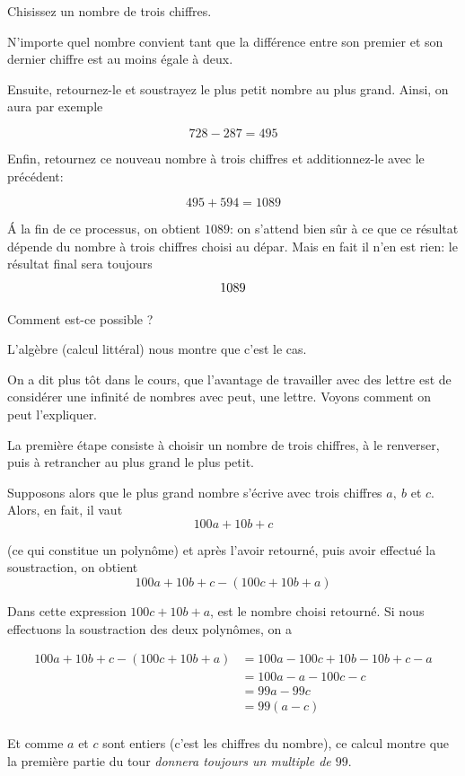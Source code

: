 \documentclass[
  12pt,
]{book}
\begin{document}
Chisissez un nombre de trois chiffres.

N'importe quel nombre convient tant que la différence entre son premier et son dernier chiffre est au moins égale à deux.

Ensuite, retournez-le et soustrayez le plus petit nombre au plus grand. Ainsi, on aura par exemple

\[728-287=495\]

Enfin, retournez ce nouveau nombre à trois chiffres et additionnez-le avec le précédent:

\[495+594=1089\]

Á la fin de ce processus, on obtient \(1089\): on s'attend bien sûr à ce que ce résultat dépende du nombre à trois chiffres choisi au dépar. Mais en fait il n'en est rien: le résultat final sera toujours
\[\Huge 1089\]

Comment est-ce possible ?

L'algèbre (calcul littéral) nous montre que c'est le cas.

On a dit plus tôt dans le cours, que l'avantage de travailler avec des lettre est de considérer une infinité de nombres avec peut, une lettre. Voyons comment on peut l'expliquer.

La première étape consiste à choisir un nombre de trois chiffres, à le renverser, puis à retrancher au plus grand le plus petit.

Supposons alors que le plus grand nombre s'écrive avec trois chiffres \(a,~b\) et \(c\). Alors, en fait, il vaut
\[100a+10b+c\]

(ce qui constitue un polynôme) et après l'avoir retourné, puis avoir effectué la soustraction, on obtient \[100a + 10b +c - (100c + 10b + a)\]

Dans cette expression \(100c + 10b + a\), est le nombre choisi retourné. Si nous effectuons la soustraction des deux polynômes, on a

\begin{align*}
100a + 10b +c - (100c + 10b + a) &= 100a -100c +10b -10b +c -a\\
                                 &= 100a - a - 100c -c\\
                                 &= 99a-99c\\
                                 &= 99(a-c)\\
\end{align*}

Et comme \(a\) et \(c\) sont entiers (c'est les chiffres du nombre), ce calcul montre que la première partie du tour \emph{donnera toujours un multiple de \(99\)}.
\end{document}
